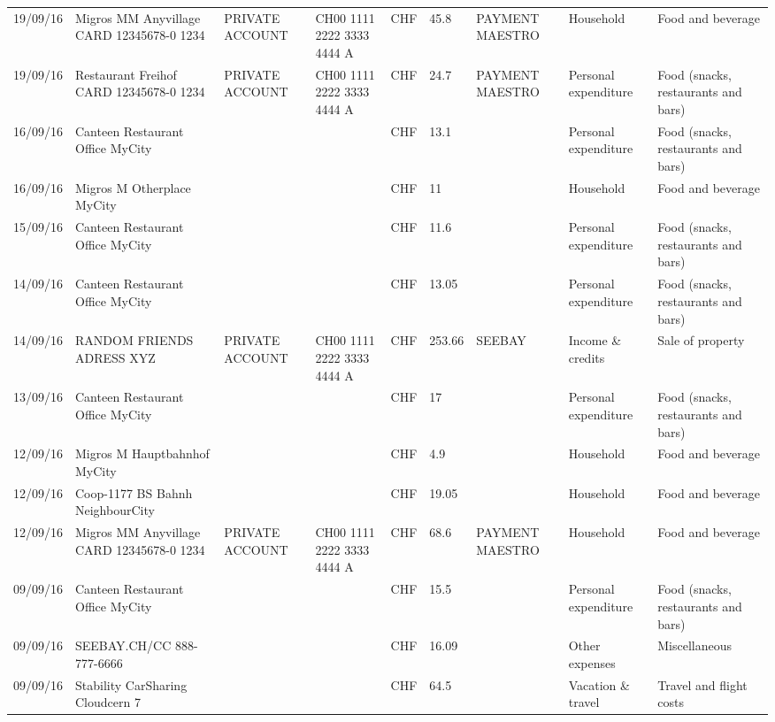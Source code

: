 \begin{landscape}
\begin{center}
\begin{longtable}{lllllllll}
		19/09/16 & Migros MM Anyvillage CARD 12345678-0 1234 & PRIVATE ACCOUNT & CH00 1111 2222 3333 4444 A & CHF   & 45.8  & PAYMENT MAESTRO & Household & Food and beverage \\
		19/09/16 & Restaurant Freihof CARD 12345678-0 1234 & PRIVATE ACCOUNT & CH00 1111 2222 3333 4444 A & CHF   & 24.7  & PAYMENT MAESTRO & Personal expenditure & Food (snacks, restaurants and bars) \\
		16/09/16 & Canteen Restaurant Office      MyCity &       &       & CHF   & 13.1  &       & Personal expenditure & Food (snacks, restaurants and bars) \\
		16/09/16 & Migros M Otherplace   MyCity &       &       & CHF   & 11    &       & Household & Food and beverage \\
		15/09/16 & Canteen Restaurant Office      MyCity &       &       & CHF   & 11.6  &       & Personal expenditure & Food (snacks, restaurants and bars) \\
		14/09/16 & Canteen Restaurant Office      MyCity &       &       & CHF   & 13.05 &       & Personal expenditure & Food (snacks, restaurants and bars) \\
		14/09/16 & RANDOM FRIENDS ADRESS XYZ & PRIVATE ACCOUNT & CH00 1111 2222 3333 4444 A & CHF   & 253.66 & SEEBAY & Income \& credits & Sale of property \\
		13/09/16 & Canteen Restaurant Office      MyCity &       &       & CHF   & 17    &       & Personal expenditure & Food (snacks, restaurants and bars) \\
		12/09/16 & Migros M Hauptbahnhof    MyCity &       &       & CHF   & 4.9   &       & Household & Food and beverage \\
		12/09/16 & Coop-1177 BS Bahnh       NeighbourCity &       &       & CHF   & 19.05 &       & Household & Food and beverage \\
		12/09/16 & Migros MM Anyvillage CARD 12345678-0 1234 & PRIVATE ACCOUNT & CH00 1111 2222 3333 4444 A & CHF   & 68.6  & PAYMENT MAESTRO & Household & Food and beverage \\
		09/09/16 & Canteen Restaurant Office      MyCity &       &       & CHF   & 15.5  &       & Personal expenditure & Food (snacks, restaurants and bars) \\
		09/09/16 & SEEBAY.CH/CC               888-777-6666 &       &       & CHF   & 16.09 &       & Other expenses & Miscellaneous \\
		09/09/16 & Stability CarSharing      Cloudcern 7 &       &       & CHF   & 64.5  &       & Vacation \& travel & Travel and flight costs \\

\end{longtable}
\end{center}
\end{landscape}
